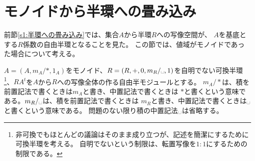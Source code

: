 \section{モノイドから半環への畳み込み}\label{s1:モノイドから半環への畳み込み} %
	前節\ref{s1:半環への畳み込み}では、集合$A$から半環$R$への写像空間が、
	$A$を基底とする$R$係数の自由半環となることを見た。
	この節では、値域がモノイドであった場合について考える。

	$A=(A,m_A/*,1_A)$をモノイド、$R=(R,+,0,m_R/\myspace,1)$を自明でない可換半環\footnote{
		非可換でもほとんどの議論はそのまま成り立つが、記述を簡潔にするために
		可換半環を考える。
		自明でないという制限は、転置写像を$1:1$にするための制限である。
	}、$RA^t$を$A$から$R$への写像全体の作る自由半モジュールとする。
	$m_A/*$は、積を前置記法で書くときは$m_A$と書き、中置記法で書くときは
	$*$と書くという意味である。$m_R/\myspace$は、積を前置記法で書くときは
	$m_R$と書き、中置記法で書くときは$\myspace$と書くという意味である。
	問題のない限り積の中置記法$\myspace$は省略する。

